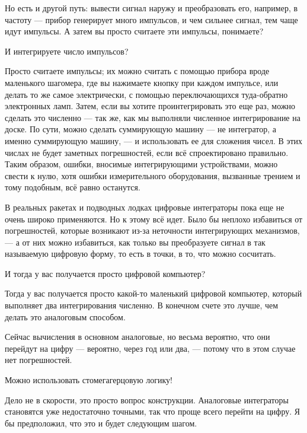 \documentclass[11pt,oneside]{article}
\begin{document}
Но есть и другой путь: вывести сигнал наружу и преобразовать его, например, в частоту --- прибор генерирует много импульсов, и чем сильнее сигнал, тем чаще идут импульсы. А затем вы просто считаете эти импульсы, понимаете?\par

И интегрируете число импульсов?\par

Просто считаете импульсы; их можно считать с помощью прибора вроде маленького шагомера, где вы нажимаете кнопку при каждом импульсе, или делать то же самое электрически, с помощью переключающихся туда-обратно электронных ламп. Затем, если вы хотите проинтегрировать это еще раз, можно сделать это численно --- так же, как мы выполняли численное интегрирование на доске. По сути, можно сделать суммирующую машину --- не интегратор, а именно суммирующую машину, --- и использовать ее для сложения чисел. В этих числах не будет заметных погрешностей, если всё спроектировано правильно. Таким образом, ошибки, вносимые интегрирующими устройствами, можно свести к нулю, хотя ошибки измерительного оборудования, вызванные трением и тому подобным, всё равно останутся.\par

В реальных ракетах и подводных лодках цифровые интеграторы пока еще не очень широко применяются. Но к этому всё идет. Было бы неплохо избавиться от погрешностей, которые возникают из-за неточности интегрирующих механизмов, --- а от них можно избавиться, как только вы преобразуете сигнал в так называемую цифровую форму, то есть в точки, в то, что можно сосчитать.\par

И тогда у вас получается просто цифровой компьютер?\par

Тогда у вас получается просто какой-то маленький цифровой компьютер, который выполняет два интегрирования численно. В конечном счете это лучше, чем делать это аналоговым способом.\par

Сейчас вычисления в основном аналоговые, но весьма вероятно, что они перейдут на цифру --- вероятно, через год или два, --- потому что в этом случае нет погрешностей.\par

Можно использовать стомегагерцовую логику!\par

Дело не в скорости, это просто вопрос конструкции. Аналоговые интеграторы становятся уже недостаточно точными, так что проще всего перейти на цифру. Я бы предположил, что это и будет следующим шагом.\par
\end{document}
